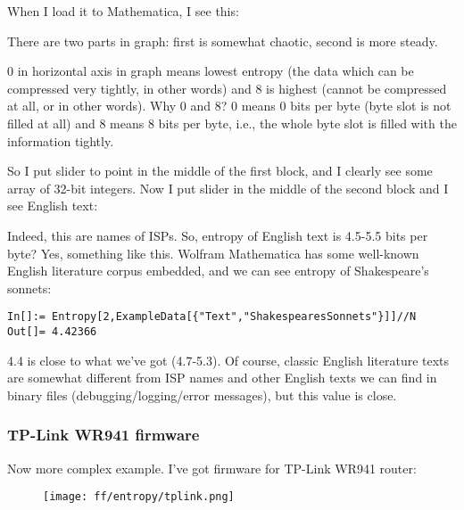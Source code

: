 When I load it to Mathematica, I see this:

\begin{figure}[H]
\centering
{}
\end{figure}

There are two parts in graph: first is somewhat chaotic, second is more steady.

0 in horizontal axis in graph means lowest entropy (the data which can be compressed very tightly,  in other words) 
and 8 is highest (cannot be compressed at all,  or  in other words).
Why 0 and 8? 0 means 0 bits per byte (byte slot is not filled at all) 
and 8 means 8 bits per byte, i.e., the whole byte slot is filled with the information tightly.

So I put slider to point in the middle of the first block, and I clearly see some array of 32-bit integers.
Now I put slider in the middle of the second block and I see English text:

\begin{figure}[H]
\centering
{}
\end{figure}

Indeed, this are names of ISPs.
So, entropy of English text is 4.5-5.5 bits per byte? Yes, something like this.
Wolfram Mathematica has some well-known English literature corpus embedded, and we can see entropy of Shakespeare's sonnets:

\begin{lstlisting}[style=custommath]
In[]:= Entropy[2,ExampleData[{"Text","ShakespearesSonnets"}]]//N
Out[]= 4.42366
\end{lstlisting}

4.4 is close to what we've got (4.7-5.3). 
Of course, classic English literature texts are somewhat different from ISP names and other English texts we can find in binary files 
(debugging/logging/error messages), but this value is close.

\subsubsection{TP-Link WR941 firmware}

Now more complex example. I've got firmware for TP-Link WR941 router:

\begin{figure}[H]
\centering
\texttt{[image: ff/entropy/tplink.png]}
\end{figure}

